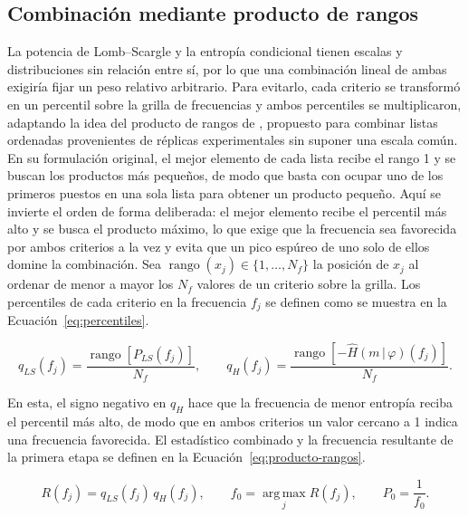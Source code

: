 \documentclass[12pt,letterpaper,oneside]{book}
\begin{document}
\subsection{Combinaci\'on mediante producto de rangos}
\label{sec:hibrido-producto-rangos}

La potencia de Lomb--Scargle y la entrop\'ia condicional tienen escalas y distribuciones sin relaci\'on entre s\'i, por lo que una combinaci\'on lineal de ambas exigir\'ia fijar un peso relativo arbitrario. Para evitarlo, cada criterio se transform\'o en un percentil sobre la grilla de frecuencias y ambos percentiles se multiplicaron, adaptando la idea del producto de rangos de \citet{Breitling2004}, propuesto para combinar listas ordenadas provenientes de r\'eplicas experimentales sin suponer una escala com\'un. En su formulaci\'on original, el mejor elemento de cada lista recibe el rango 1 y se buscan los productos m\'as peque\~nos, de modo que basta con ocupar uno de los primeros puestos en una sola lista para obtener un producto peque\~no. Aqu\'i se invierte el orden de forma deliberada: el mejor elemento recibe el percentil m\'as alto y se busca el producto m\'aximo, lo que exige que la frecuencia sea favorecida por ambos criterios a la vez y evita que un pico esp\'ureo de uno solo de ellos domine la combinaci\'on. Sea $\operatorname{rango}(x_j)\in\{1,\dots,N_f\}$ la posici\'on de $x_j$ al ordenar de menor a mayor los $N_f$ valores de un criterio sobre la grilla. Los percentiles de cada criterio en la frecuencia $f_j$ se definen como se muestra en la Ecuaci\'on~\eqref{eq:percentiles}.

\begin{equation}
	q_{LS}(f_j) = \frac{\operatorname{rango}\left[P_{LS}(f_j)\right]}{N_f}, \qquad q_{H}(f_j) = \frac{\operatorname{rango}\left[-\hat H(m\,|\,\varphi)(f_j)\right]}{N_f}.
	\label{eq:percentiles}
\end{equation}

En esta, el signo negativo en $q_H$ hace que la frecuencia de menor entrop\'ia reciba el percentil m\'as alto, de modo que en ambos criterios un valor cercano a 1 indica una frecuencia favorecida. El estad\'istico combinado y la frecuencia resultante de la primera etapa se definen en la Ecuaci\'on~\eqref{eq:producto-rangos}.

\begin{equation}
	R(f_j) = q_{LS}(f_j)\,q_{H}(f_j), \qquad f_0 = \operatorname*{arg\,max}_{j} R(f_j), \qquad P_0 = \frac{1}{f_0}.
	\label{eq:producto-rangos}
\end{equation}
\end{document}

